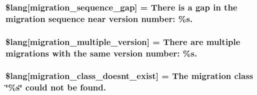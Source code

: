 \subsubsection[{\$lang}]{\setlength{\rightskip}{0pt plus 5cm}\$lang\mbox{[}\textquotesingle{}migration\+\_\+sequence\+\_\+gap\textquotesingle{}\mbox{]} = \textquotesingle{}There is {\bf a} gap in the migration sequence near {\bf version} number\+: \%s.\textquotesingle{}}\label{system_2language_2english_2migration__lang_8php_ab1f43d98bc1365f4b753d783a8802697}
\hypertarget{system_2language_2english_2migration__lang_8php_a1a98130d04f280e6a5f6f509179f9e01}{}
\subsubsection[{\$lang}]{\setlength{\rightskip}{0pt plus 5cm}\$lang\mbox{[}\textquotesingle{}migration\+\_\+multiple\+\_\+version\textquotesingle{}\mbox{]} = \textquotesingle{}There are multiple migrations with the same {\bf version} number\+: \%s.\textquotesingle{}}\label{system_2language_2english_2migration__lang_8php_a1a98130d04f280e6a5f6f509179f9e01}
\hypertarget{system_2language_2english_2migration__lang_8php_a141dceda5b8294f6e4ddf7e5da6fe71d}{}
\subsubsection[{\$lang}]{\setlength{\rightskip}{0pt plus 5cm}\$lang\mbox{[}\textquotesingle{}migration\+\_\+class\+\_\+doesnt\+\_\+exist\textquotesingle{}\mbox{]} = \textquotesingle{}The migration class \char`\"{}\%s\char`\"{} could not be found.\textquotesingle{}}\label{system_2language_2english_2migration__lang_8php_a141dceda5b8294f6e4ddf7e5da6fe71d}
\hypertarget{system_2language_2english_2migration__lang_8php_a4bc9c60a4f078d1845d1d72370c363e8}{}
